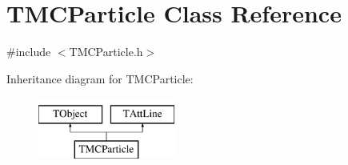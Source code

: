 \hypertarget{class_t_m_c_particle}{\section{T\+M\+C\+Particle Class Reference}
\label{class_t_m_c_particle}
}


{\ttfamily \#include $<$T\+M\+C\+Particle.\+h$>$}

Inheritance diagram for T\+M\+C\+Particle\+:\begin{figure}[H]
\begin{center}
\leavevmode
\includegraphics[height=2.000000cm]{class_t_m_c_particle}
\end{center}
\end{figure}
